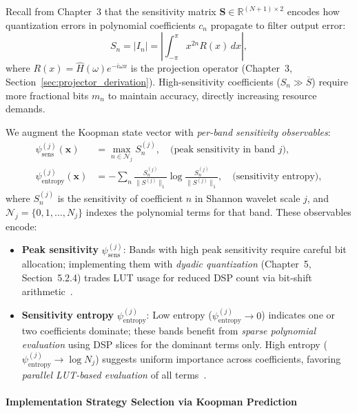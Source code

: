 Recall from Chapter~3 that the sensitivity matrix $\mathbf{S} \in \mathbb{R}^{(N+1) \times 2}$ encodes how quantization errors in polynomial coefficients $c_n$ propagate to filter output error:
\[
S_n = |I_n| = \left| \int_{-\pi}^{\pi} x^{2n} R(x) \, dx \right|,
\]
where $R(x) = \widehat{H}(\omega) e^{-i\omega x}$ is the projection operator (Chapter~3, Section~\ref{sec:projector_derivation}). High-sensitivity coefficients ($S_n \gg \overline{S}$) require more fractional bits $m_n$ to maintain accuracy, directly increasing resource demands.

We augment the Koopman state vector with \emph{per-band sensitivity observables}:
\begin{align}
\psi_{\text{sens}}^{(j)}(\mathbf{x}) &= \max_{n \in \mathcal{N}_j} S_n^{(j)}, \quad \text{(peak sensitivity in band $j$)}, \label{eq:obs_sens_peak}\\
\psi_{\text{entropy}}^{(j)}(\mathbf{x}) &= -\sum_{n} \frac{S_n^{(j)}}{\|S^{(j)}\|_1} \log \frac{S_n^{(j)}}{\|S^{(j)}\|_1}, \quad \text{(sensitivity entropy)}, \label{eq:obs_sens_entropy}
\end{align}
where $S_n^{(j)}$ is the sensitivity of coefficient $n$ in Shannon wavelet scale $j$, and $\mathcal{N}_j = \{0, 1, \ldots, N_j\}$ indexes the polynomial terms for that band. These observables encode:
\begin{itemize}
    \item \textbf{Peak sensitivity} $\psi_{\text{sens}}^{(j)}$: Bands with high peak sensitivity require careful bit allocation; implementing them with \emph{dyadic quantization} (Chapter~5, Section~5.2.4) trades LUT usage for reduced DSP count via bit-shift arithmetic~\cite{Abdi2024,Gustafsson2007}.
    \item \textbf{Sensitivity entropy} $\psi_{\text{entropy}}^{(j)}$: Low entropy ($\psi_{\text{entropy}}^{(j)} \to 0$) indicates one or two coefficients dominate; these bands benefit from \emph{sparse polynomial evaluation} using DSP slices for the dominant terms only. High entropy ($\psi_{\text{entropy}}^{(j)} \to \log N_j$) suggests uniform importance across coefficients, favoring \emph{parallel LUT-based evaluation} of all terms~\cite{SinhaSrikanthan2014}.
\end{itemize}

\paragraph{Implementation Strategy Selection via Koopman Prediction}

